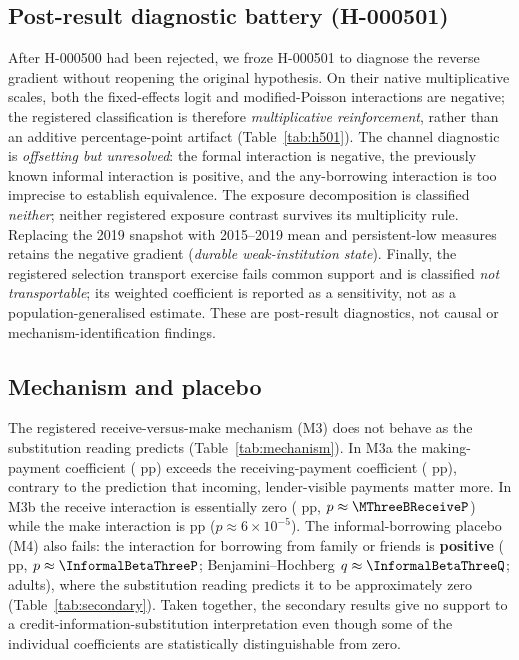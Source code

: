 \subsection{Post-result diagnostic battery (H-000501)}

After H-000500 had been rejected, we froze H-000501 to diagnose the reverse gradient without
reopening the original hypothesis. On their native multiplicative scales, both the fixed-effects
logit and modified-Poisson interactions are negative; the registered classification is therefore
\emph{multiplicative reinforcement}, rather than an additive percentage-point artifact
(Table~\ref{tab:h501}). The channel diagnostic is \emph{offsetting but unresolved}: the formal
interaction is negative, the previously known informal interaction is positive, and the
any-borrowing interaction is too imprecise to establish equivalence. The exposure decomposition
is classified \emph{neither}; neither registered exposure contrast survives its multiplicity
rule. Replacing the 2019 snapshot with 2015--2019 mean and persistent-low measures retains the
negative gradient (\emph{durable weak-institution state}). Finally, the registered selection
transport exercise fails common support and is classified \emph{not transportable}; its weighted
coefficient is reported as a sensitivity, not as a population-generalised estimate. These are
post-result diagnostics, not causal or mechanism-identification findings.



\subsection{Mechanism and placebo}

The registered receive-versus-make mechanism (M3) does not behave as the substitution
reading predicts (Table~\ref{tab:mechanism}). In M3a the making-payment coefficient
(\MThreeAMake{} pp) exceeds the receiving-payment coefficient (\MThreeAReceive{} pp),
contrary to the prediction that incoming, lender-visible payments matter more. In M3b the
receive interaction is essentially zero (\MThreeBReceive{} pp, $p\approx\MThreeBReceiveP$)
while the make interaction is \MThreeBMake{} pp ($p\approx 6\times10^{-5}$). The
informal-borrowing placebo (M4) also fails: the interaction for borrowing from family or
friends is \textbf{positive} (\InformalBetaThree{} pp, $p\approx\InformalBetaThreeP$;
Benjamini--Hochberg $q\approx\InformalBetaThreeQ$; \InformalN{} adults), where the
substitution reading predicts it to be approximately zero (Table~\ref{tab:secondary}).
Taken together, the secondary results give no support to a credit-information-substitution
interpretation even though some of the individual coefficients are statistically
distinguishable from zero.


